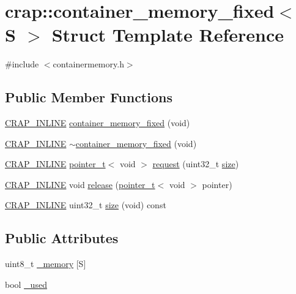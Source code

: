 \hypertarget{structcrap_1_1container__memory__fixed}{\section{crap\+:\+:container\+\_\+memory\+\_\+fixed$<$ S $>$ Struct Template Reference}
\label{structcrap_1_1container__memory__fixed}
}


{\ttfamily \#include $<$containermemory.\+h$>$}

\subsection*{Public Member Functions}
\begin{DoxyCompactItemize}
\item 
\hyperlink{config__x86_8h_a5a40526b8d842e7ff731509998bb0f1c}{C\+R\+A\+P\+\_\+\+I\+N\+L\+I\+N\+E} \hyperlink{structcrap_1_1container__memory__fixed_a53da8459f3fcb3cff6208ad641fd654b}{container\+\_\+memory\+\_\+fixed} (void)
\item 
\hyperlink{config__x86_8h_a5a40526b8d842e7ff731509998bb0f1c}{C\+R\+A\+P\+\_\+\+I\+N\+L\+I\+N\+E} \hyperlink{structcrap_1_1container__memory__fixed_ae94b8e1488ecb93db2eee0a54530ae51}{$\sim$container\+\_\+memory\+\_\+fixed} (void)
\item 
\hyperlink{config__x86_8h_a5a40526b8d842e7ff731509998bb0f1c}{C\+R\+A\+P\+\_\+\+I\+N\+L\+I\+N\+E} \hyperlink{structcrap_1_1pointer__t}{pointer\+\_\+t}$<$ void $>$ \hyperlink{structcrap_1_1container__memory__fixed_ad9ae89cb1c3e5bb95d80c76309710dbf}{request} (uint32\+\_\+t \hyperlink{structcrap_1_1container__memory__fixed_af33254a0f8d522cc64c3342def6f8dea}{size})
\item 
\hyperlink{config__x86_8h_a5a40526b8d842e7ff731509998bb0f1c}{C\+R\+A\+P\+\_\+\+I\+N\+L\+I\+N\+E} void \hyperlink{structcrap_1_1container__memory__fixed_a54ba61f6d06fa03365fc9c1fefebfcb4}{release} (\hyperlink{structcrap_1_1pointer__t}{pointer\+\_\+t}$<$ void $>$ pointer)
\item 
\hyperlink{config__x86_8h_a5a40526b8d842e7ff731509998bb0f1c}{C\+R\+A\+P\+\_\+\+I\+N\+L\+I\+N\+E} uint32\+\_\+t \hyperlink{structcrap_1_1container__memory__fixed_af33254a0f8d522cc64c3342def6f8dea}{size} (void) const 
\end{DoxyCompactItemize}
\subsection*{Public Attributes}
\begin{DoxyCompactItemize}
\item 
uint8\+\_\+t \hyperlink{structcrap_1_1container__memory__fixed_aca7e7c7805d9307b7067b736e9b4647f}{\+\_\+memory} \mbox{[}S\mbox{]}
\item 
bool \hyperlink{structcrap_1_1container__memory__fixed_aa017408f7c4feeb5fe1ad88338a237ab}{\+\_\+used}
\end{DoxyCompactItemize}


